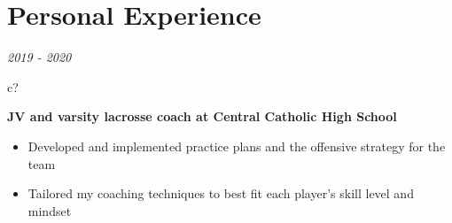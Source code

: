 \documentclass[12pt,a4paper,sans]{moderncv} %
\begin{document}
 \begin{comment}
\vspace{-4 mm}
\section{Publications}

\textit{2017 - 2018}
\hspace{2 mm}
\begin{tabular}{c?}
 \\
\end{tabular}
 \hspace{2 mm} \textbf{Rsyncmark} - a benchmark for \textit{rsync} 
 
 \begin{itemize}
 \addtolength{\itemindent}{31.7 mm} 
  \item Researched the effects that various operating system kernels have on the performance 
 
  \hspace{30.5 mm} of  unix-based tool \textit{rsync}
 \item{Wrote a 40 page thesis to report my findings }
 \end{itemize}
\end{comment}


\section{Personal Experience}

 \textit{2019 - 2020}
\hspace{1 mm}
\begin{tabular}{c?} \\
\end{tabular}
 \hspace{1 mm}
 \textbf{JV and varsity lacrosse coach at Central Catholic High School} 
 \vspace{0 mm}
 \begin{itemize}
 \addtolength{\itemindent}{31.7 mm}
 \item{Developed and implemented practice plans and the offensive strategy for the team}
 \item{Tailored my coaching techniques to best fit each player's skill level and mindset}
 
 \end{itemize}
 
\end{document}
